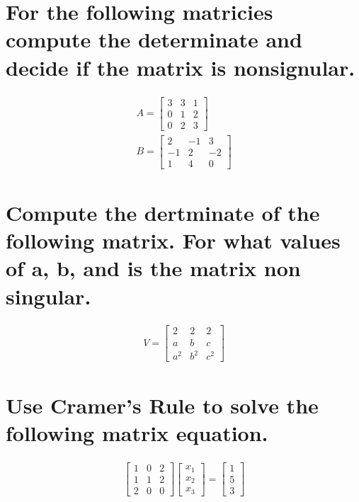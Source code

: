 \documentclass{assignment}
\begin{document}
\section{For the following matricies compute the determinate and decide if the matrix is nonsignular.}
\begin{align}
  A = \begin{bmatrix}
    3 & 3 & 1 \\
    0 & 1 & 2 \\
    0 & 2 & 3
  \end{bmatrix} \\
  B = \begin{bmatrix}
    2 & -1 & 3 \\
    -1 & 2 & -2 \\
    1 & 4 & 0 
  \end{bmatrix}
\end{align}

\newpage

\section{Compute the dertminate of the following matrix. For what values of a, b, and is the matrix non singular.}
\begin{align}
  V = \begin{bmatrix}
    2 & 2 & 2 \\
    a & b & c \\
    a^2 & b^2 & c^2
  \end{bmatrix}
\end{align}

\newpage

\section{Use Cramer's Rule to solve the following matrix equation.}
\begin{align}
  \begin{bmatrix}
    1 & 0 & 2 \\
    1 & 1 & 2 \\
    2 & 0 & 0
  \end{bmatrix}
  \begin{bmatrix}
    x_1 \\
    x_2 \\
    x_3
  \end{bmatrix}
  =
  \begin{bmatrix}
    1 \\
    5 \\
    3
  \end{bmatrix}
\end{align}
\end{document}
